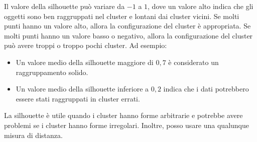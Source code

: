 Il valore della silhouette può variare da $-1$ a $1$, dove un valore alto indica
che gli oggetti sono ben raggruppati nel cluster e lontani dai cluster vicini.
Se molti punti hanno un valore alto, allora la configurazione del cluster è
appropriata. Se molti punti hanno un valore basso o negativo, allora la
configurazione del cluster può avere troppi o troppo pochi cluster.
Ad esempio:
\begin{itemize}
      \item Un valore medio della silhouette maggiore di $0,7$ è considerato un
            raggruppamento solido.
      \item Un valore medio della silhouette inferiore a $0,2$ indica che i
            dati potrebbero essere stati raggruppati in cluster errati.
\end{itemize}
La silhouette è utile quando i cluster hanno forme arbitrarie e potrebbe avere
problemi se i cluster hanno forme irregolari. Inoltre, posso usare una qualunque
misura di distanza.